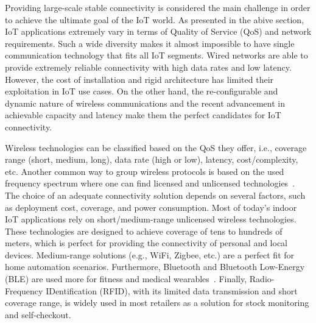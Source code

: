 \documentclass[]{IEEEtran}
\begin{document}
Providing large-scale stable connectivity is considered the main challenge in order to achieve the ultimate goal of the IoT world.
As presented in the abive section, IoT applications extremely vary in terms of Quality of Service (QoS) and network requirements.
Such a wide diversity makes it almost impossible to have single communication technology that fits all IoT segments\cite{vaezi_cellular_2022_2}.
Wired networks are able to provide extremely reliable connectivity with high data rates and low latency.
However, the cost of installation and rigid architecture has limited their exploitation in IoT use cases.
On the other hand, the re-configurable and dynamic nature of wireless communications and the recent advancement in achievable capacity and latency make them the perfect candidates for IoT connectivity.

Wireless technologies can be classified based on the QoS they offer, i.e., coverage range (short, medium, long), data rate (high or low), latency, cost/complexity, etc.
Another common way to group wireless protocols is based on the used frequency spectrum where one can find licensed and unlicensed technologies~\cite{xu_narrowband_2018_3}.
The choice of an adequate connectivity solution depends on several factors, such as deployment cost, coverage, and power consumption.
Most of today's indoor IoT applications rely on short/medium-range unlicensed wireless technologies.
These technologies are designed to achieve coverage of tens to hundreds of meters, which is perfect for providing the connectivity of personal and local devices.
Medium-range solutions (e.g., WiFi, Zigbee, etc.) are a perfect fit for home automation scenarios.
Furthermore, Bluetooth and Bluetooth Low-Energy (BLE) are used more for fitness and medical wearables~\cite{vaezi_cellular_2022_2}.
Finally, Radio-Frequency IDentification (RFID), with its limited data transmission and short coverage range, is widely used in most retailers as a solution for stock monitoring and self-checkout\cite{beyene_nb-iot_2017}.
\end{document}

